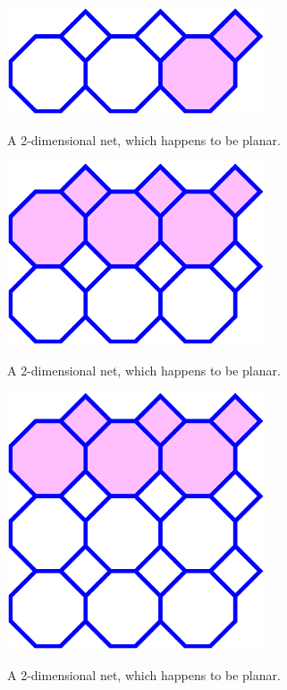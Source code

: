 \documentclass{beamer}
\begin{document}
\begin{frame}
  \begin{center}
    \includegraphics[width=3in]{periodic3}

    A 2-dimensional net, which happens to be planar.
  \end{center}
\end{frame}

\begin{frame}
  \begin{center}
    \includegraphics[width=3in]{periodic4}

    A 2-dimensional net, which happens to be planar.
  \end{center}
\end{frame}

\begin{frame}
  \begin{center}
    \includegraphics[width=3in]{periodic5}

    A 2-dimensional net, which happens to be planar.
  \end{center}
\end{frame}
\end{document}
